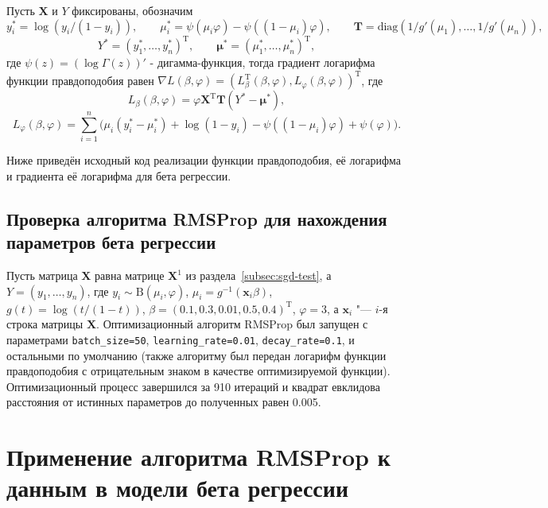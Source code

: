 \documentclass{article}
\begin{document}
Пусть $\mathbf{X}$ и $Y$ фиксированы, обозначим
\[
  y_i^* = \log(y_i / (1 - y_i)), \qquad \mu_i^*=\psi(\mu_i\varphi) - \psi((1 - \mu_i)\varphi), \qquad
  \mathbf{T} = \mathrm{diag}\left( 1 / g'(\mu_1), \ldots, 1 / g'(\mu_n) \right),
\]
\[
  Y^* = (y_1^*, \ldots, y_n^*)^{\mathrm{T}}, \qquad \boldsymbol{\mu}^* = (\mu_1^*, \ldots, \mu_n^*)^{\mathrm{T}},
\]
где $\psi(z) = (\log\Gamma(z))'$ - дигамма-функция, тогда градиент логарифма функции правдоподобия равен
$\nabla L(\beta, \varphi) = \left( L_{\beta}^{\mathrm{T}}(\beta, \varphi), L_{\varphi}(\beta, \varphi) \right)^{\mathrm{T}}$, где
\[
  L_{\beta}(\beta, \varphi) = \varphi \mathbf{X}^{\mathrm{T}}\mathbf{T}(Y^* - \boldsymbol{\mu^*}),
\]
\[
  L_{\varphi}(\beta, \varphi) = \sum_{i=1}^n
  \big(
    \mu_i(y_i^* - \mu_i^*) + \log(1 - y_i) - \psi((1 - \mu_i)\varphi) + \psi(\varphi)
  \big).
\]

Ниже приведён исходный код реализации функции правдоподобия, её логарифма и градиента её логарифма
для бета регрессии.


\subsection{Проверка алгоритма RMSProp для нахождения параметров бета регрессии}
Пусть матрица $\mathbf{X}$ равна матрице $\mathbf{X}^1$ из раздела~\ref{subsec:sgd-test},
а $Y = (y_1, \ldots, y_n)$, где $y_i \sim \mathrm{B}(\mu_i, \varphi)$,
$\mu_i = g^{-1}(\boldsymbol{x}_i\beta)$, $g(t) = \log(t / (1-t))$,
$\beta = (0.1, 0.3, 0.01, 0.5, 0.4)^{\mathrm{T}}$, $\varphi = 3$, а $\boldsymbol{x}_i$ "--- $i$-я строка
матрицы $\mathbf{X}$.
Оптимизационный алгоритм RMSProp был запущен с параметрами
\verb|batch_size=50|, \verb|learning_rate=0.01|, \verb|decay_rate=0.1|, и остальными по
умолчанию (также алгоритму был передан логарифм функции правдоподобия с отрицательным знаком
в качестве оптимизируемой функции).
Оптимизационный процесс завершился за 910 итераций и квадрат евклидова расстояния от истинных
параметров до полученных равен 0.005.

\section{Применение алгоритма RMSProp к данным в модели бета регрессии}



\end{document}
